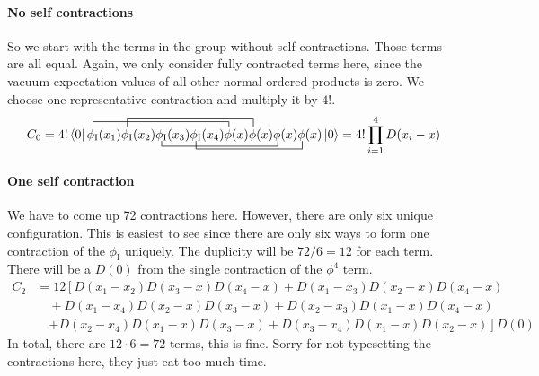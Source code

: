 \documentclass[11pt, english, fleqn, DIV=15, headinclude, BCOR=1cm]{scrartcl}
\begin{document}
\paragraph{No self contractions}

So we start with the terms in the group without self contractions. Those
terms are all equal. Again, we only consider fully contracted terms here, since
the vacuum expectation values of all other normal ordered products is zero. We
choose one representative contraction and multiply it by $4!$.
\[
    C_0
    = 4! \bra 0
    \contraction{}{\phi_\mathrm I} {(x_1)\phi_\mathrm I(x_2) \phi_\mathrm I(x_3) \phi_\mathrm I(x_4)} {\phi}
    \contraction[1.5ex]{\phi_\mathrm I(x_1)}{\phi_\mathrm I}{(x_2) \phi_\mathrm I(x_3)
    \phi_\mathrm I(x_4) \phi(x)} {\phi}
    \bcontraction{\phi_\mathrm I(x_1) \phi_\mathrm I(x_2)}{\phi_\mathrm I}{(x_3)
    \phi_\mathrm I(x_4) \phi(x) \phi(x)} {\phi}
    \bcontraction[1.5ex]{\phi_\mathrm I(x_1) \phi_\mathrm I(x_2) \phi_\mathrm I(x_3)
    }{\phi_\mathrm I}{(x_4) \phi(x) \phi(x) \phi(x)} {\phi}
    \phi_\mathrm I(x_1)
    \phi_\mathrm I(x_2)
    \phi_\mathrm I(x_3)
    \phi_\mathrm I(x_4)
    \phi(x) \phi(x) \phi(x) \phi(x)
    \ket 0
    = 4! \prod_{i = 1}^4 D(x_i - x)
\]

\paragraph{One self contraction}

We have to come up 72 contractions here. However, there are only six unique
configuration. This is easiest to see since there are only six ways to form one
contraction of the $\phi_\mathrm I$ uniquely. The duplicity will be $72 / 6 =
12$ for each term. There will be a $D(0)$ from the single contraction of the
$\phi^4$ term.
\begin{align*}
    C_2 &= 12 \left[
        D(x_1 - x_2) D(x_3 - x) D(x_4 - x)
        + D(x_1 - x_3) D(x_2 - x) D(x_4 - x)
        \right. \\ &\quad
        + D(x_1 - x_4) D(x_2 - x) D(x_3 - x)
        + D(x_2 - x_3) D(x_1 - x) D(x_4 - x)
        \\ &\quad \left.
        + D(x_2 - x_4) D(x_1 - x) D(x_3 - x)
        + D(x_3 - x_4) D(x_1 - x) D(x_2 - x)
    \right] D(0)
\end{align*}
In total, there are $12 \cdot 6 = 72$ terms, this is fine. Sorry for not
typesetting the contractions here, they just eat too much time.
\end{document}
